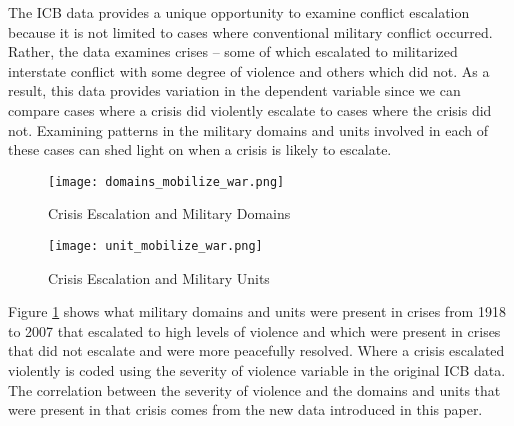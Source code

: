 \documentclass[12pt,letterpaper]{article}
\begin{document}
The ICB data provides a unique opportunity to examine conflict escalation because it is not limited to cases where conventional military conflict occurred. Rather, the data examines crises -- some of which escalated to militarized interstate conflict with some degree of violence and others which did not. As a result, this data provides variation in the dependent variable since we can compare cases where a crisis did violently escalate to cases where the crisis did not. Examining patterns in the military domains and units involved in each of these cases can shed light on when a crisis is likely to escalate.

\begin{figure}[H]
	\centering
	\texttt{[image: domains\_mobilize\_war.png]}
	\caption{Crisis Escalation and Military Domains}
	\label{fig:app_escal_domain}
\end{figure}

\begin{figure}[H]
	\centering
	\texttt{[image: unit\_mobilize\_war.png]}
	\caption{Crisis Escalation and Military Units}
	\label{fig:app_escal_unit}
\end{figure}

Figure \ref{fig:app_escal_domain} shows what military domains and units were present in crises from 1918 to 2007 that escalated to high levels of violence and which were present in crises that did not escalate and were more peacefully resolved. Where a crisis escalated violently is coded  using the severity of violence variable in the original ICB data. The correlation between the severity of violence and the domains and units that were present in that crisis comes from the new data introduced in this paper.
\end{document}

